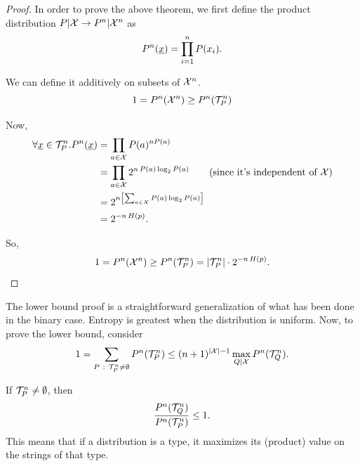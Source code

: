 \begin{proof}
	In order to prove the above theorem, we first define the product distribution $P|\mathcal{X} \to P^n|\mathcal{X}^n$ as 
	\begin{equation*}
		P^n(\underline{x}) = \prod_{i = 1}^nP(x_i).
	\end{equation*}

	We can define it additively on subsets of $\mathcal{X}^n$.
	\begin{equation*}
		1 = P^n(\mathcal{X}^n) \ge P^n(\mathcal{T}_P^n)
	\end{equation*}

	Now,
	\begin{align*}
		\forall \str{x} \in \T_P^n . P^n(\str{x})
		& =
		\prod_{a \in \X} P(a)^{n P(a)}
		\\
		& =
		\prod_{a \in \X} 2^{n \, P(a)\log_2 P(a)} \tag{since it's independent of $\X$}
		\\
		& =
		2^{n \left[\sum_{a \in \X} P(a) \log_2 P(a) \right]}
		\\
		& =
		2^{-n \, \Entropy{p}}.
	\end{align*}

	So,
	\begin{equation*}
		1 = P^n(\mathcal{X}^n) \ge P^n(\mathcal{T}_P^n) = \left|{\mathcal{T}_P^n}\right| \cdot 2^{-n \, H\left({p}\right)}. \qedhere
	\end{equation*}
\end{proof}

The lower bound proof is a straightforward generalization of what has been done in the binary case.
Entropy is greatest when the distribution is uniform.
Now, to prove the lower bound, consider
\begin{equation*}
	1 =
	\sum_{P\ :\ \mathcal{T}_P^n \neq \emptyset} P^n(\mathcal{T}_P^n) \le
	(n+1)^{\left|{\mathcal{X}}\right|-1} \max_{Q|\mathcal{X}} P^n(\mathcal{T}_Q^n).
\end{equation*}

\begin{obs}
	If $\mathcal{T}_P^n \neq \emptyset$, then 
	\begin{equation*}
		\frac{P^n(\mathcal{T}_Q^n)}{P^n(\mathcal{T}_P^n)} \le 1.
	\end{equation*}
	This means that if a distribution is a type, it maximizes its (product) value on the strings of that type. 
\end{obs}

